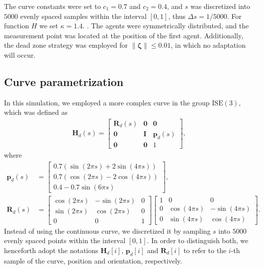 The curve constants were set to $c_1 = 0.7$ and $c_2 = 0.4$, and $s$ was discretized into $5000$ evenly spaced samples within the interval $[0, 1]$, thus $\Delta s=1\slash5000$. For function $H$ we set $\kappa=1.4$. . The agents were symmetrically distributed, and the measurement point was located at the position of the first agent. Additionally, the dead zone strategy \citep{ioannou2012robust} was employed for $\|\boldsymbol{\zeta}\| \le 0.01$, in which no adaptation will occur.

\subsection{Curve parametrization}
In this simulation, we employed a more complex curve in the group $\text{ISE}(3)$, which was defined as
\begin{align}
    \mathbf{H}_d(s) = \begin{bmatrix}
        \mathbf{R}_d(s) & \mathbf{0} & \mathbf{0}\\
        \mathbf{0} & \mathbf{I} & \mathbf{p}_d(s)\\
        \mathbf{0} & \mathbf{0} & 1
    \end{bmatrix},\label{eq:parametriceq-simulation}
\end{align}
where
\begin{align}
    \mathbf{p}_d(s) &= \begin{bmatrix}
        0.7(\sin(2\pi s) + 2\sin(4\pi s))\\
        0.7(\cos(2\pi s) - 2\cos(4\pi s))\\
        0.4 - 0.7\sin(6\pi s)
    \end{bmatrix},\\
    \mathbf{R}_d(s) &= \begin{bmatrix}
        \cos(2\pi s) & -\sin(2\pi s) & 0\\
        \sin(2\pi s) & \cos(2\pi s) & 0\\
        0 & 0 & 1
    \end{bmatrix}\begin{bmatrix}
        1 & 0 & 0\\
        0 & \cos(4\pi s) & -\sin(4\pi s)\\
        0 & \sin(4\pi s) & \cos(4\pi s)
    \end{bmatrix}.
\end{align}
Instead of using the continuous curve, we discretized it by sampling $s$ into $5000$ evenly spaced points within the interval $[0, 1]$. In order to distinguish both, we henceforth adopt the notations $\mathbf{H}_d[i]$, $\mathbf{p}_d[i]$ and $\mathbf{R}_d[i]$ to refer to the $i$-th sample of the curve, position and orientation, respectively.


